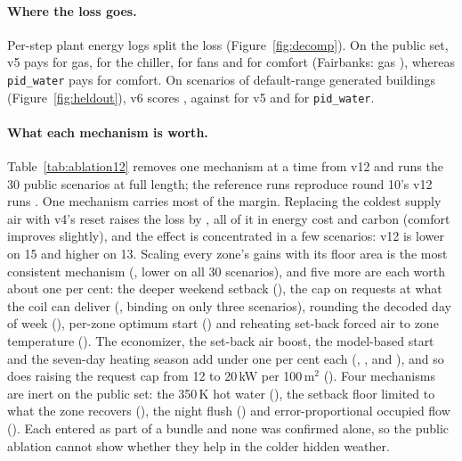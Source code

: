 \documentclass{article}
\begin{document}
\paragraph{Where the loss goes.} Per-step plant energy logs split the loss (Figure~\ref{fig:decomp}). On the public set, v5 pays \DecPubVFiveGasShare{} for gas, \DecPubVFiveCoolingShare{} for the chiller, \DecPubVFiveFanShare{} for fans and \DecPubVFiveComfortShare{} for comfort (Fairbanks: gas \DecPubVFiveGasShareFairbanks), whereas \texttt{pid\_water} pays \RegretSharePidWater{} for comfort. On \NHeldAll{} scenarios of \NHeldAllBuild{} default-range generated buildings (Figure~\ref{fig:heldout}), v6 scores \HeldAllMetricOurs{}, against \HeldAllMetricOursVFive{} for v5 and \HeldAllMetricPidWater{} for \texttt{pid\_water}.

\paragraph{What each mechanism is worth.} Table~\ref{tab:ablation12} removes one mechanism at a time from v12 and runs the 30 public scenarios at full length; the reference runs reproduce round 10's v12 runs \RElvAbRefMatch. One mechanism carries most of the margin. Replacing the coldest supply air with v4's reset raises the loss by \RElvAbSatRel, all of it in energy cost and carbon (comfort improves slightly), and the effect is concentrated in a few scenarios: v12 is lower on 15 and higher on 13. Scaling every zone's gains with its floor area is the most consistent mechanism (\RElvAbNoareaRel, lower on all 30 scenarios), and five more are each worth about one per cent: the deeper weekend setback (\RElvAbNoweekendRel), the cap on requests at what the coil can deliver (\RElvAbNowcapRel, binding on only three scenarios), rounding the decoded day of week (\RElvAbNodowRel), per-zone optimum start (\RElvAbNozoneRel) and reheating set-back forced air to zone temperature (\RElvAbNoneutralRel). The economizer, the set-back air boost, the model-based start and the seven-day heating season add under one per cent each (\RElvAbNoeconRel, \RElvAbNoboostRel, \RElvAbNomodelRel{} and \RElvAbNoseasonRel), and so does raising the request cap from 12 to 20\,kW per 100\,m$^2$ (\RElvAbQcapRel). Four mechanisms are inert on the public set: the 350\,K hot water (\RElvAbTwRel), the setback floor limited to what the zone recovers (\RElvAbNofloorRel), the night flush (\RElvAbNoflushRel) and error-proportional occupied flow (\RElvAbNooccdynRel). Each entered as part of a bundle and none was confirmed alone, so the public ablation cannot show whether they help in the colder hidden weather.
\end{document}
